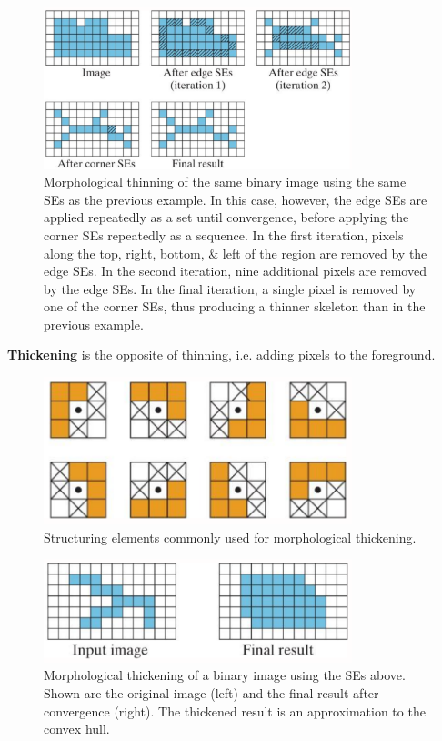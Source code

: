 \documentclass[a4paper,11pt]{article}
\begin{document}
\begin{figure}[H]
    \centering
    \includegraphics[width=0.8\textwidth]{images/thinningofsameimageusingSEs.png}
    \caption{
        Morphological thinning of the same binary image using the same SEs as the previous example.
        In this case, however, the edge SEs are applied repeatedly as a set until convergence, before applying the corner SEs repeatedly as a sequence.
        In the first iteration, pixels along the top, right, bottom, \& left of the region are removed by the edge SEs.
        In the second iteration, nine additional pixels are removed by the edge SEs.
        In the final iteration, a single pixel is removed by one of the corner SEs, thus producing a thinner skeleton than in the previous example.
    }
\end{figure}

\textbf{Thickening} is the opposite of thinning, i.e. adding pixels to the foreground.
\begin{figure}[H]
    \centering
    \includegraphics[width=0.8\textwidth]{images/thickeningSEs.png}
    \caption{
        Structuring elements commonly used for morphological thickening.
    }
\end{figure}

\begin{figure}[H]
    \centering
    \includegraphics[width=0.8\textwidth]{images/thickeningSEsbinaryexample.png}
    \caption{
        Morphological thickening of a binary image using the SEs above.
        Shown are the original image (left) and the final result after convergence (right).
        The thickened result is an approximation to the convex hull.
    }
\end{figure}
\end{document}
